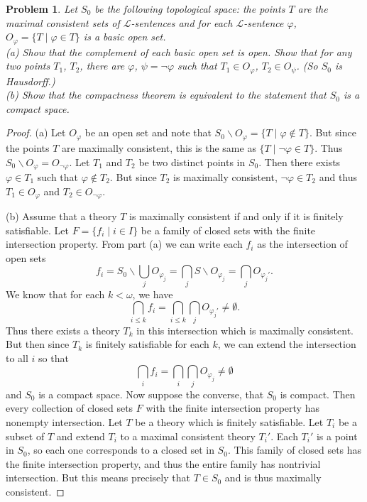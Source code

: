 \documentclass{article}
\newtheorem{problem}{Problem}
\begin{document}
\begin{problem}
Let $S_0$ be the following topological space: the points $T$ are the maximal consistent sets of $\mathcal{L}$-sentences and for each $\mathcal{L}$-sentence $\varphi$, $O_{\varphi}= \{T \mid \varphi \in T\}$ is a basic open set.\\
(a) Show that the complement of each basic open set is open. Show that for any two points $T_1$, $T_2$, there are $\varphi$, $\psi = \neg \varphi$ such that $T_1 \in O_{\varphi}$, $T_2 \in O_{\psi}$. (So $S_0$ is Hausdorff.)\\
(b) Show that the compactness theorem is equivalent to the statement that $S_0$ is a compact space.
\end{problem}
\begin{proof}
(a) Let $O_{\varphi}$ be an open set and note that $S_0 \backslash O_{\varphi} = \{T \mid \varphi \notin T\}$. But since the points $T$ are maximally consistent, this is the same as $\{T \mid \neg \varphi \in T\}$. Thus $S_0 \backslash O_{\varphi} = O_{\neg \varphi}$. Let $T_1$ and $T_2$ be two distinct points in $S_0$. Then there exists $\varphi \in T_1$ such that $\varphi \notin T_2$. But since $T_2$ is maximally consistent, $\neg \varphi \in T_2$ and thus $T_1 \in O_{\varphi}$ and $T_2 \in O_{\neg \varphi}$.

(b) Assume that a theory $T$ is maximally consistent if and only if it is finitely satisfiable. Let $F = \{f_i \mid i \in I\}$ be a family of closed sets with the finite intersection property. From part (a) we can write each $f_i$ as the intersection of open sets
\[
f_i = S_0 \backslash \bigcup_{j} O_{\varphi_j} = \bigcap_{j} S \backslash O_{\varphi_j} = \bigcap_{j} O_{\varphi_{j}'}.
\]
We know that for each $k < \omega$, we have
\[
\bigcap_{i \leq k} f_i = \bigcap_{i \leq k} \bigcap_{j} O_{\varphi_j'} \neq \emptyset.
\]
Thus there exists a theory $T_k$ in this intersection which is maximally consistent. But then since $T_k$ is finitely satisfiable for each $k$, we can extend the intersection to all $i$ so that
\[
\bigcap_{i} f_i = \bigcap_i \bigcap_j O_{\varphi_j} \neq \emptyset
\]
and $S_0$ is a compact space. Now suppose the converse, that $S_0$ is compact. Then every collection of closed sets $F$ with the finite intersection property has nonempty intersection. Let $T$ be a theory which is finitely satisfiable. Let $T_i$ be a subset of $T$ and extend $T_i$ to a maximal consistent theory $T_i'$. Each $T_i'$ is a point in $S_0$, so each one corresponds to a closed set in $S_0$. This family of closed sets has the finite intersection property, and thus the entire family has nontrivial intersection. But this means precisely that $T \in S_0$ and is thus maximally consistent.
\end{proof}
\end{document}
